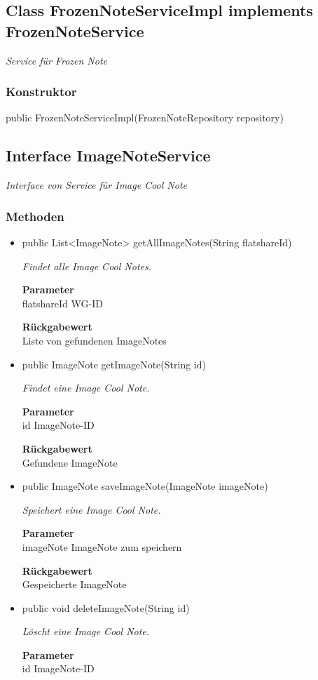 \documentclass[a4paper]{scrreprt}
\begin{document}
    \subsection{Class FrozenNoteServiceImpl implements FrozenNoteService}
    \textit{Service für Frozen Note}
    \subsubsection{Konstruktor}
    public FrozenNoteServiceImpl(FrozenNoteRepository repository)
    \subsection{Interface ImageNoteService}
    \textit{Interface von Service für Image Cool Note}
    \subsubsection{Methoden}
    \begin{itemize}
    	\item{public List<ImageNote> getAllImageNotes(String flatshareId)}
    	
    	\textit{Findet alle Image Cool Notes.}
    	
    	\textbf{Parameter} \\
    	flatshareId WG-ID
    	
    	\textbf{Rückgabewert} \\
    	Liste von gefundenen ImageNotes        \item{public ImageNote getImageNote(String id)}
    	
    	\textit{Findet eine Image Cool Note.}
    	
    	\textbf{Parameter} \\
    	id ImageNote-ID
    	
    	\textbf{Rückgabewert} \\
    	Gefundene ImageNote        \item{public ImageNote saveImageNote(ImageNote imageNote)}
    	
    	\textit{Speichert eine Image Cool Note.}
    	
    	\textbf{Parameter} \\
    	imageNote ImageNote zum speichern
    	
    	\textbf{Rückgabewert} \\
    	Gespeicherte ImageNote        \item{public void deleteImageNote(String id)}
    	
    	\textit{Löscht eine Image Cool Note.}
    	
    	\textbf{Parameter} \\
    	id ImageNote-ID
    	
    	
    \end{itemize}
\end{document}
